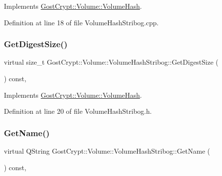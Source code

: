 Implements \hyperlink{class_gost_crypt_1_1_volume_1_1_volume_hash_a8ae75f9cc4beea8ecb8751ecb221c797}{Gost\+Crypt\+::\+Volume\+::\+Volume\+Hash}.



Definition at line 18 of file Volume\+Hash\+Stribog.\+cpp.

\mbox{\label{class_gost_crypt_1_1_volume_1_1_volume_hash_stribog_ad29dc8a4e0ed0f2f3e20afc2f691c74d}} 
\subsubsection{\texorpdfstring{Get\+Digest\+Size()}{GetDigestSize()}}
{\footnotesize\ttfamily virtual size\+\_\+t Gost\+Crypt\+::\+Volume\+::\+Volume\+Hash\+Stribog\+::\+Get\+Digest\+Size (\begin{DoxyParamCaption}{ }\end{DoxyParamCaption}) const\hspace{0.3cm}{\ttfamily [inline]}, {\ttfamily [virtual]}}



Implements \hyperlink{class_gost_crypt_1_1_volume_1_1_volume_hash_a3677448f436ac856778274dafdc36ed4}{Gost\+Crypt\+::\+Volume\+::\+Volume\+Hash}.



Definition at line 20 of file Volume\+Hash\+Stribog.\+h.

\mbox{\label{class_gost_crypt_1_1_volume_1_1_volume_hash_stribog_a8a6c7c3679703c27e816be9679d44250}} 
\subsubsection{\texorpdfstring{Get\+Name()}{GetName()}}
{\footnotesize\ttfamily virtual Q\+String Gost\+Crypt\+::\+Volume\+::\+Volume\+Hash\+Stribog\+::\+Get\+Name (\begin{DoxyParamCaption}{ }\end{DoxyParamCaption}) const\hspace{0.3cm}{\ttfamily [inline]}, {\ttfamily [virtual]}}



